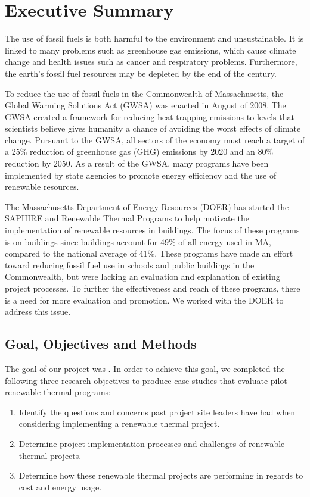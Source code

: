 \chapter*{Executive Summary}

\par The use of fossil fuels is both harmful to the environment and unsustainable. It is linked to many problems such as greenhouse gas emissions, which cause climate change and health issues such as cancer and respiratory problems. Furthermore, the earth's fossil fuel resources may be depleted by the end of the century.
\par To reduce the use of fossil fuels in the Commonwealth of Massachusetts, the Global Warming Solutions Act (GWSA) was enacted in August of 2008. The GWSA created a framework for reducing heat-trapping emissions to levels that scientists believe gives humanity a chance of avoiding the worst effects of climate change. Pursuant to the GWSA, all sectors of the economy must reach a target of a 25\% reduction of greenhouse gas (GHG) emissions by 2020 and an 80\% reduction by 2050. As a result of the GWSA, many programs have been implemented by state agencies to promote energy efficiency and the use of renewable resources.
\par The Massachusetts Department of Energy Resources (DOER) has started the SAPHIRE and Renewable Thermal Programs to help motivate the implementation of renewable resources in buildings. The focus of these programs is on buildings since buildings account for 49\% of all energy used in MA, compared to the national average of 41\%. These programs have made an effort toward reducing fossil fuel use in schools and public buildings in the Commonwealth, but were lacking an evaluation and explanation of existing project processes. To further the effectiveness and reach of these programs, there is a need for more evaluation and promotion. We worked with the DOER to address this issue.

\section*{Goal, Objectives and Methods}
\par The goal of our project was \goal. In order to achieve this goal, we completed the following three research objectives to produce case studies that evaluate pilot renewable thermal programs:
\begin{enumerate}
  \item{Identify the questions and concerns past project site leaders have had when considering implementing a renewable thermal project.}
  \item{Determine project implementation processes and challenges of renewable thermal projects.}
  \item{Determine how these renewable thermal projects are performing in regards to cost and energy usage.}
\end{enumerate}


